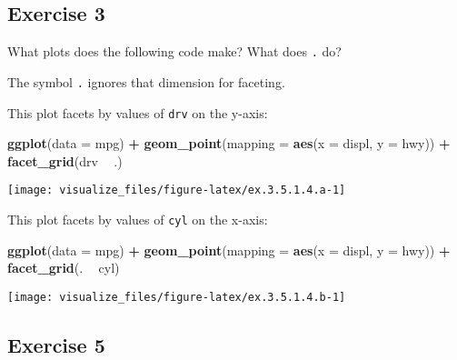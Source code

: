 \documentclass[]{book}
\newenvironment{Shaded}{\begin{snugshade}}{\end{snugshade}}
\newcommand{\DataTypeTok}[1]{\textcolor[rgb]{0.13,0.29,0.53}{#1}}
\newcommand{\KeywordTok}[1]{\textcolor[rgb]{0.13,0.29,0.53}{\textbf{#1}}}
\newcommand{\NormalTok}[1]{#1}
\newcommand{\OperatorTok}[1]{\textcolor[rgb]{0.81,0.36,0.00}{\textbf{#1}}}
\newcommand{\StringTok}[1]{\textcolor[rgb]{0.31,0.60,0.02}{#1}}
\theoremstyle{plain}
\theoremstyle{remark}
\theoremstyle{definition}
\theoremstyle{definition}
\theoremstyle{definition}
\theoremstyle{remark}
\begin{document}
\hypertarget{exercise-3-1}{%
\subsection{Exercise 3}\label{exercise-3-1}}

What plots does the following code make? What does \texttt{.} do?

The symbol \texttt{.} ignores that dimension for faceting.

This plot facets by values of \texttt{drv} on the y-axis:

\begin{Shaded}
\begin{Highlighting}[]
\KeywordTok{ggplot}\NormalTok{(}\DataTypeTok{data =}\NormalTok{ mpg) }\OperatorTok{+}
\StringTok{  }\KeywordTok{geom_point}\NormalTok{(}\DataTypeTok{mapping =} \KeywordTok{aes}\NormalTok{(}\DataTypeTok{x =}\NormalTok{ displ, }\DataTypeTok{y =}\NormalTok{ hwy)) }\OperatorTok{+}
\StringTok{  }\KeywordTok{facet_grid}\NormalTok{(drv }\OperatorTok{~}\StringTok{ }\NormalTok{.)}
\end{Highlighting}
\end{Shaded}

\begin{center}\texttt{[image: visualize\_files/figure-latex/ex.3.5.1.4.a-1]} \end{center}

This plot facets by values of \texttt{cyl} on the x-axis:

\begin{Shaded}
\begin{Highlighting}[]
\KeywordTok{ggplot}\NormalTok{(}\DataTypeTok{data =}\NormalTok{ mpg) }\OperatorTok{+}
\StringTok{  }\KeywordTok{geom_point}\NormalTok{(}\DataTypeTok{mapping =} \KeywordTok{aes}\NormalTok{(}\DataTypeTok{x =}\NormalTok{ displ, }\DataTypeTok{y =}\NormalTok{ hwy)) }\OperatorTok{+}
\StringTok{  }\KeywordTok{facet_grid}\NormalTok{(. }\OperatorTok{~}\StringTok{ }\NormalTok{cyl)}
\end{Highlighting}
\end{Shaded}

\begin{center}\texttt{[image: visualize\_files/figure-latex/ex.3.5.1.4.b-1]} \end{center}

\hypertarget{exercise-5-1}{%
\subsection{Exercise 5}\label{exercise-5-1}}
\end{document}
